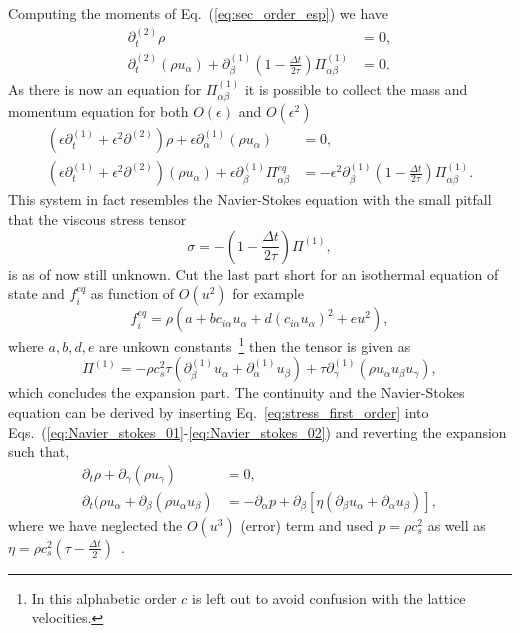 Computing the moments of Eq.~(\ref{eq:sec_order_esp}) we have
\begin{align}
    \partial_t^{(2)}\rho &= 0, \\
    \partial_t^{(2)}(\rho u_{\alpha}) + \partial^{(1)}_{\beta}\left(1 - \frac{\Delta t}{2\tau}\right)\Pi_{\alpha\beta}^{(1)} &= 0.
\end{align}
As there is now an equation for $\Pi^{(1)}_{\alpha\beta}$ it is possible to collect the mass and momentum equation for both $O(\epsilon)$ and $O(\epsilon^2)$
\begin{align}
    (\epsilon\partial_t^{(1)} + \epsilon^2\partial^{(2)})\rho + \epsilon\partial_{\alpha}^{(1)}(\rho u_{\alpha}) &= 0, \label{eq:Navier_stokes_01}\\
    (\epsilon\partial_t^{(1)} + \epsilon^2\partial^{(2)})(\rho u_{\alpha}) + \epsilon\partial_{\beta}^{(1)}\Pi^{eq}_{\alpha\beta} &= -\epsilon^2\partial_{\beta}^{(1)}\left(1 - \frac{\Delta t}{2\tau}\right) \Pi^{(1)}_{\alpha\beta}. \label{eq:Navier_stokes_02}
\end{align}
This system in fact resembles the Navier-Stokes equation with the small pitfall that the viscous stress tensor
\begin{equation}
    \sigma = - \left(1 - \frac{\Delta t}{2\tau}\right) \Pi^{(1)},
\end{equation}
is as of now still unknown.
Cut the last part short for an isothermal equation of state and $f_{i}^{eq}$ as function of $O(u^2)$ for example
\begin{equation}\label{eq:eqi_dist1}
    f_{i}^{eq} = \rho(a + b c_{i\alpha} u_{\alpha} + d (c_{i\alpha} u_{\alpha})^2 + e u^2),
\end{equation}
where $a, b, d, e$ are unkown constants~\footnote{In this alphabetic order $c$ is left out to avoid confusion with the lattice velocities.} then the tensor is given as
\begin{equation}\label{eq:stress_first_order}
    \Pi^{(1)} = -\rho c_s^2\tau(\partial_{\beta}^{(1)}u_{\alpha} + \partial_{\alpha}^{(1)}u_{\beta}) + \tau\partial_{\gamma}^{(1)}(\rho u_{\alpha} u_{\beta} u_{\gamma}),
\end{equation}
which concludes the expansion part.
The continuity and the Navier-Stokes equation can be derived by inserting Eq.~{\ref{eq:stress_first_order}} into Eqs.~(\ref{eq:Navier_stokes_01}-\ref{eq:Navier_stokes_02}) and reverting the expansion such that,
\begin{align}
    \partial_t\rho + \partial_{\gamma}(\rho u_{\gamma}) &= 0, \\
    \partial_t(\rho u_{\alpha} + \partial_{\beta}(\rho u_{\alpha}u_{\beta}) &= -\partial_{\alpha}p + \partial_{\beta}[\eta(\partial_{\beta}u_{\alpha} +\partial_{\alpha}u_{\beta})],
\end{align}
where we have neglected the $O(u^3)$ (error) term and used $p = \rho c_s^{2}$ as well as $\eta = \rho c_s^{2}\left(\tau - \frac{\Delta t}{2}\right)$~\cite{krugerLatticeBoltzmannMethod2017}.

